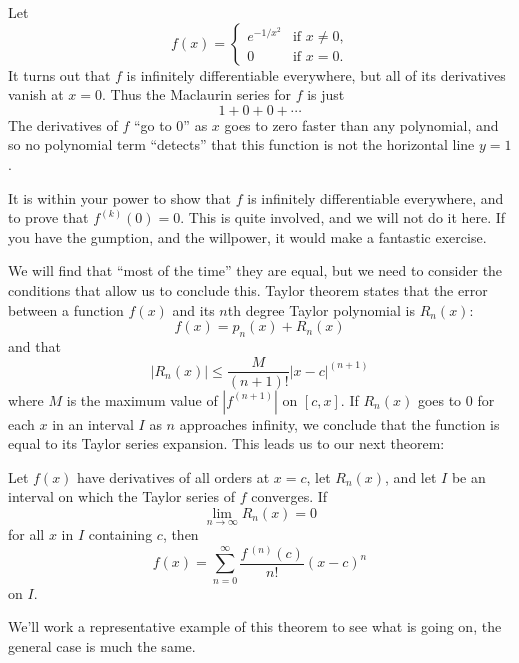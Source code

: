 \documentclass{ximera}
\begin{document}
\begin{example}  %
	Let 
	\[
	f(x) = \begin{cases}
		e^{-1/x^2} &\text{if $x \neq 0$,}\\
		0 &\text{if $x = 0$.}
	\end{cases}
	\]
	It turns out that $f$ is infinitely differentiable everywhere,
        but all of its derivatives vanish at $x=0$. Thus the Maclaurin series for $f$ is just
        \[
        1 + 0 + 0+ \cdots
        \]
        The derivatives of $f$ ``go to $0$'' as $x$ goes to zero
        faster than any polynomial, and so no polynomial term
        ``detects'' that this function is not the horizontal line
        $y=1$.

        It is within your power to show that $f$ is infinitely
        differentiable everywhere, and to prove that $f^{(k)}(0) = 0$.
        This is quite involved, and we will not do it here.  If you
        have the gumption, and the willpower, it would make a
        fantastic exercise.
\end{example}

We will find that ``most of the time'' they are equal, but we need to
consider the conditions that allow us to conclude this.  Taylor
theorem states that the error between a function $f(x)$ and its $n$th
degree Taylor polynomial is $R_n(x)$:
\[
f(x) = p_n(x) + R_n(x)
\]
and that 
\[
\left|R_n(x)\right| \leq \frac{M}{(n+1)!}|x-c|^{(n+1)}
\]
where $M$ is the maximum value of $|f^{(n+1)}|$ on $[c,x]$.  If
$R_n(x)$ goes to $0$ for each $x$ in an interval $I$ as $n$ approaches
infinity, we conclude that the function is equal to its Taylor series
expansion. This leads us to our next theorem:

\begin{theorem}
Let $f(x)$ have derivatives of all orders at $x=c$, let $R_n(x)$, and
let $I$ be an interval on which the Taylor series of $f$ converges.
If
\[
\lim_{n\to\infty} R_n(x) = 0
\]
for all $x$ in $I$ containing $c$, then
\[
f(x) = \sum_{n=0}^\infty \frac{f\,^{(n)}(c)}{n!}(x-c)^n
\]
on $I$.
\end{theorem}

We'll work a representative example of this theorem to see what is
going on, the general case is much the same.
\end{document}
